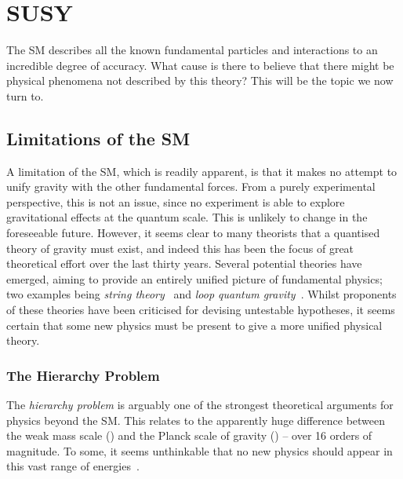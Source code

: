 \chapter{\acl{SUSY}}
\label{sec:susy}
The \ac{SM} describes all the known fundamental particles and interactions to an
incredible degree of accuracy. What cause is there to believe that there might
be physical phenomena not described by this theory? This will be the topic we
now turn to.

\section{Limitations of the \acl{SM}}
\label{sec:susy_limitations_sm}
A limitation of the \ac{SM}, which is readily apparent, is that it makes no
attempt to unify gravity with the other fundamental forces. From a purely
experimental perspective, this is not an issue, since no experiment is able to
explore gravitational effects at the quantum scale. This is unlikely to change
in the foreseeable future. However, it seems clear to many theorists that a
quantised theory of gravity must exist, and indeed this has been the focus of
great theoretical effort over the last thirty years. Several potential theories
have emerged, aiming to provide an entirely unified picture of fundamental
physics; two examples being \emph{string theory}~\cite{string_theory} and
\emph{loop quantum gravity}~\cite{loop_quantum}. Whilst proponents of these
theories have been criticised for devising untestable hypotheses, it seems
certain that some new physics must be present to give a more unified physical
theory.

\subsection{The Hierarchy Problem}
The \emph{hierarchy problem} is arguably one of the strongest theoretical
arguments for physics beyond the \ac{SM}. This relates to the apparently huge
difference between the weak mass scale (\Mweak) and the Planck scale of gravity
(\Mplanck) -- over 16 orders of magnitude. To some, it seems unthinkable that no
new physics should appear in this vast range of energies~\cite{susy_primer}.

